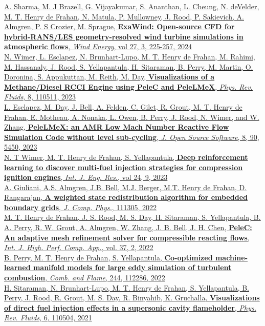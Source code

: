 \documentclass[11pt,letterpaper]{article}
\begin{document}
\href{https://doi.org/10.1002/we.2886}{A. Sharma, M. J Brazell, G. Vijayakumar, S. Ananthan, L. Cheung, N. deVelder, M. T. Henry de Frahan, N. Matula, P. Mullowney, J. Rood, P. Sakievich, A. Almgren, P. S Crozier, M. Sprague, \textbf{ExaWind: Open-source CFD for hybrid-RANS/LES geometry-resolved wind turbine simulations in atmospheric flows}, \textit{Wind Energy}, vol 27, 3, 225-257, 2024}\\[2ex]
\href{https://doi.org/10.1103/PhysRevFluids.8.110511}{N. Wimer, L. Esclapez, N. Brunhart-Lupo, M. T. Henry de Frahan, M. Rahimi, M. Hassanaly, J. Rood, S. Yellapantula, H. Sitaraman, B. Perry, M. Martin, O. Doronina, S. Appukuttan, M. Reith, M. Day, \textbf{Visualizations of a Methane/Diesel RCCI Engine using PeleC and PeleLMeX}, \textit{Phys. Rev. Fluids}, 8, 110511, 2023}\\[2ex]
\href{https://doi.org/10.21105/joss.05450}{L. Esclapez, M. Day, J. Bell, A. Felden, C. Gilet, R. Grout, M. T. Henry de Frahan, E. Motheau, A. Nonaka, L. Owen, B. Perry, J. Rood, N. Wimer, and W. Zhang, \textbf{PeleLMeX: an AMR Low Mach Number Reactive Flow Simulation Code without level sub-cycling}, \textit{J. Open Source Software}, 8, 90, 5450, 2023}\\[2ex]
\href{https://doi.org/10.1177/1468087423118400}{N. T Wimer, M. T. Henry de Frahan, S. Yellapantula, \textbf{Deep reinforcement learning to discover multi-fuel injection strategies for compression ignition engines}, \textit{Int. J. Eng. Res.}, vol 24, 9, 2023}\\[2ex]
\href{https://doi.org/10.1103/PhysRevFluids.6.110504}{A. Giuliani, A.S. Almgren, J.B. Bell, M.J. Berger, M.T. Henry de Frahan, D. Rangarajan, \textbf{A weighted state redistribution algorithm for embedded boundary grids}, \textit{J. Comp. Phys.}, 111305, 2022}\\[2ex]
\href{https://doi.org/10.1177/10943420221121151}{M. T. Henry de Frahan, J. S. Rood, M. S. Day, H. Sitaraman, S. Yellapantula, B. A. Perry, R. W. Grout, A. Almgren, W. Zhang, J. B. Bell, J. H. Chen, \textbf{PeleC: An adaptive mesh refinement solver for compressible reacting flows}, \textit{Int. J. High. Perf. Comp. App.}, vol. 37, 2, 2022}\\[2ex]
\href{https://doi.org/10.1016/j.combustflame.2022.112286}{B. Perry, M. T. Henry de Frahan, S. Yellapantula, \textbf{Co-optimized machine-learned manifold models for large eddy simulation of turbulent combustion}, \textit{Comb. and Flame}, 244, 112286, 2022}\\[2ex]
\href{https://doi.org/10.1103/PhysRevFluids.6.110504}{H. Sitaraman, N. Brunhart-Lupo, M. T. Henry de Frahan, S. Yellapantula, B. Perry, J. Rood, R. Grout, M. S. Day, R. Binyahib, K. Gruchalla, \textbf{Visualizations of direct fuel injection effects in a supersonic cavity flameholder}, \textit{Phys. Rev. Fluids}, 6, 110504, 2021}\\[2ex]
\end{document}
